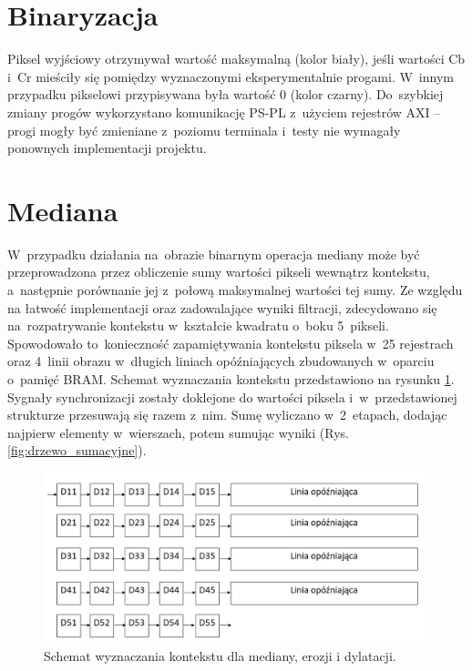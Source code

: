 \section{Binaryzacja}
\label{subsec:Binaryzacja}
Piksel wyjściowy otrzymywał wartość maksymalną (kolor biały), jeśli wartości Cb i~Cr mieściły się pomiędzy wyznaczonymi eksperymentalnie progami.  
W~innym przypadku pikselowi przypisywana była wartość 0 (kolor czarny). 
Do~szybkiej zmiany progów wykorzystano komunikację PS-PL z~użyciem rejestrów AXI -- progi mogły być zmieniane z~poziomu terminala i~testy nie wymagały ponownych implementacji projektu.  


\section{Mediana}
\label{subsec:Mediana}

W~przypadku działania na~obrazie binarnym operacja mediany może być przeprowadzona przez obliczenie sumy wartości pikseli wewnątrz kontekstu, a~następnie porównanie jej z~połową maksymalnej wartości tej sumy. 
Ze względu na łatwość implementacji oraz zadowalające wyniki filtracji, zdecydowano się na~rozpatrywanie kontekstu w~kształcie kwadratu o~boku 5~pikseli. 
Spowodowało to~konieczność zapamiętywania kontekstu piksela w~25 rejestrach oraz 4~linii obrazu w~długich liniach opóźniających zbudowanych w~oparciu o~pamięć BRAM.
Schemat wyznaczania kontekstu przedstawiono na rysunku \ref{fig:kontekst}. 
Sygnały synchronizacji zostały doklejone do wartości piksela i~w~przedstawionej strukturze przesuwają się razem z~nim. 
Sumę wyliczano w~2~etapach, dodając najpierw elementy w~wierszach, potem sumując wyniki (Rys. \ref{fig:drzewo_sumacyjne}).

\begin{figure}[h]
	\centering
	\includegraphics[width=\textwidth]{kontekst.jpg}
	\caption{Schemat wyznaczania kontekstu dla mediany, erozji i dylatacji.}
	\label{fig:kontekst}
\end{figure}  

